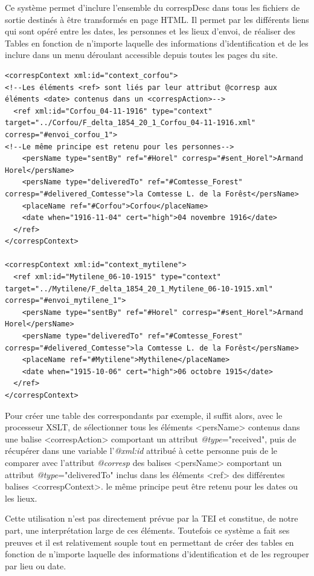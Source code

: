 \documentclass[12pt,a4paper]{book} %
\begin{document}
Ce système permet d'inclure l'ensemble du correspDesc dans tous les fichiers de sortie destinés à être transformés en page HTML. Il permet par les différents liens qui sont opéré entre les dates, les personnes et les lieux d'envoi, de réaliser des Tables en fonction de n'importe laquelle des informations d'identification et de les inclure dans un menu déroulant accessible depuis toutes les pages du site. 
\bigskip

\begin{lstlisting}
<correspContext xml:id="context_corfou">
<!--Les éléments <ref> sont liés par leur attribut @corresp aux éléments <date> contenus dans un <correspAction>-->
  <ref xml:id="Corfou_04-11-1916" type="context" target="../Corfou/F_delta_1854_20_1_Corfou_04-11-1916.xml" corresp="#envoi_corfou_1">
<!--Le même principe est retenu pour les personnes-->
    <persName type="sentBy" ref="#Horel" corresp="#sent_Horel">Armand Horel</persName>
    <persName type="deliveredTo" ref="#Comtesse_Forest" corresp="#delivered_Comtesse">la Comtesse L. de la Forêst</persName> 
    <placeName ref="#Corfou">Corfou</placeName>
    <date when="1916-11-04" cert="high">04 novembre 1916</date>
  </ref>                  
</correspContext>
            
<correspContext xml:id="context_mytilene">
  <ref xml:id="Mytilene_06-10-1915" type="context" target="../Mytilene/F_delta_1854_20_1_Mytilene_06-10-1915.xml" corresp="#envoi_mytilene_1">
    <persName type="sentBy" ref="#Horel" corresp="#sent_Horel">Armand Horel</persName>
    <persName type="deliveredTo" ref="#Comtesse_Forest" corresp="#delivered_Comtesse">la Comtesse L. de la Forêst</persName> 
    <placeName ref="#Mytilene">Mythilene</placeName>
    <date when="1915-10-06" cert="high">06 octobre 1915</date>
  </ref>
</correspContext>
\end{lstlisting}
\bigskip

Pour créer une table des correspondants par exemple, il suffit alors, avec le processeur XSLT, de sélectionner tous les éléments <persName> contenus dans une balise <correspAction> comportant un attribut \textit{@type}="received", puis de récupérer dans une variable l'\textit{@xml:id} attribué à cette personne puis de le comparer avec l'attribut \textit{@corresp} des balises <persName> comportant un attribut \textit{@type}="deliveredTo" inclus dans les éléments <ref> des différentes balises <correspContext>. le même principe peut être retenu pour les dates ou les lieux.  

Cette utilisation n'est pas directement prévue par la TEI et constitue, de notre part, une interprétation large de ces éléments. Toutefois ce système a fait ses preuves et il est relativement souple tout en permettant de créer des tables en fonction de n'importe laquelle des informations d'identification et de les regrouper par lieu ou date.
\end{document}
